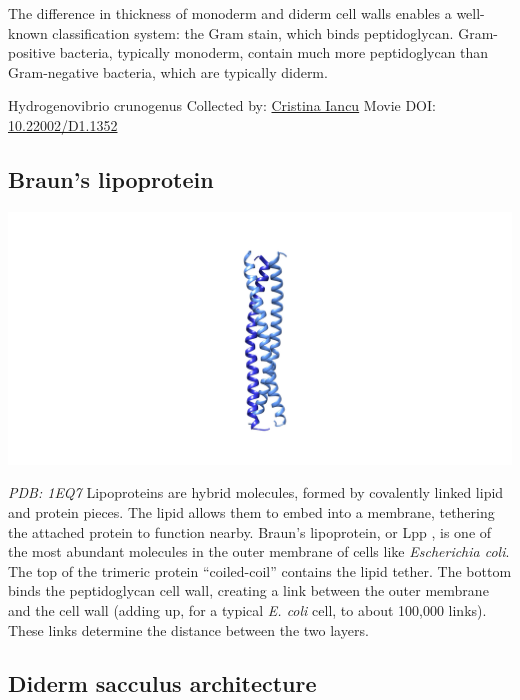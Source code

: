 \documentclass[]{tufte-book}
\begin{document}
The difference in thickness of monoderm and diderm cell walls enables a well-known classification system: the Gram stain, which binds peptidoglycan. Gram-positive bacteria, typically monoderm, contain much more peptidoglycan than Gram-negative bacteria, which are typically diderm.



\hypertarget{htmlwidget-cbb24cc0e581fea21a4a}{}

\label{fig:2-3}Hydrogenovibrio crunogenus Collected by: \protect\hyperlink{cristina_iancu}{Cristina Iancu} Movie DOI: \href{https://doi.org/10.22002/D1.1352}{10.22002/D1.1352}

\hypertarget{Brauns_lipoprotein}{%
\subsection{Braun's lipoprotein}\label{Brauns_lipoprotein}}

\includegraphics{img/schematics/2_3_1}

\emph{PDB: 1EQ7}
Lipoproteins are hybrid molecules, formed by covalently linked lipid and protein pieces. The lipid allows them to embed into a membrane, tethering the attached protein to function nearby. Braun's lipoprotein, or Lpp \citep{shu2000}, is one of the most abundant molecules in the outer membrane of cells like \emph{Escherichia coli}. The top of the trimeric protein ``coiled-coil'' contains the lipid tether. The bottom binds the peptidoglycan cell wall, creating a link between the outer membrane and the cell wall (adding up, for a typical \emph{E. coli} cell, to about 100,000 links). These links determine the distance between the two layers.

\hypertarget{Diderm_sacculus_architecture}{%
\subsection{Diderm sacculus architecture}\label{Diderm_sacculus_architecture}}
\end{document}
